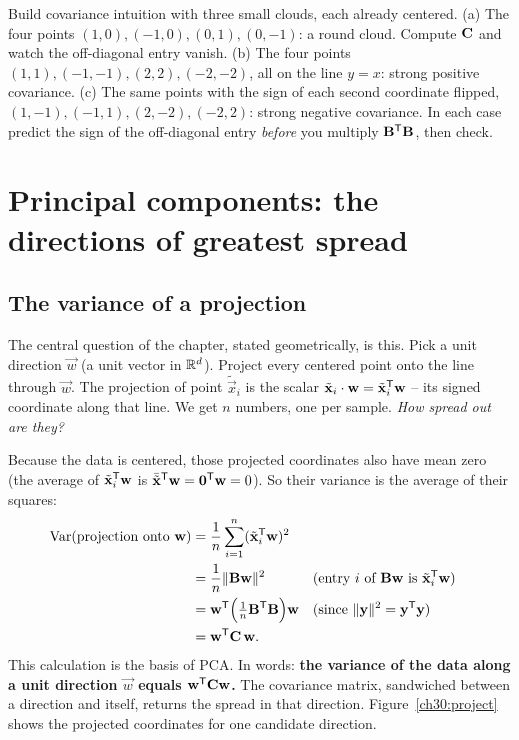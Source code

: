 \begin{labbox}
Build covariance intuition with three small clouds, each already centered.
(a) The four points $(1,0),(-1,0),(0,1),(0,-1)$: a round cloud. Compute $\mathbf{C}$ and
watch the off-diagonal entry vanish. (b) The four points $(1,1),(-1,-1),(2,2),(-2,-2)$,
all on the line $y=x$: strong positive covariance. (c) The same points with the sign
of each second coordinate flipped, $(1,-1),(-1,1),(2,-2),(-2,2)$: strong negative
covariance. In each case predict the sign of the off-diagonal entry \emph{before}
you multiply $\mathbf{B}^{\mathsf{T}}\mathbf{B}$, then check.
\end{labbox}

\section{Principal components: the directions of greatest spread}
\label{ch30:sec-pc}

\subsection{The variance of a projection}

The central question of the chapter, stated geometrically, is this. Pick a
unit direction $\vec w$ (a unit vector in $\mathbb{R}^d$). Project every centered point
onto the line through $\vec w$. The projection of point $\tilde{\vec x}_i$ is the
scalar $\tilde{\mathbf{x}}_i\cdot\mathbf{w} = \tilde{\mathbf{x}}_i^{\mathsf{T}}\mathbf{w}$ -- its signed
coordinate along that line. We get $n$ numbers, one per sample. \emph{How spread
out are they?}

Because the data is centered, those projected coordinates also have mean zero (the
average of $\tilde{\mathbf{x}}_i^{\mathsf{T}}\mathbf{w}$ is $\bar{\tilde{\mathbf{x}}}^{\mathsf{T}}\mathbf{w}=\mathbf{0}^{\mathsf{T}}\mathbf{w}=0$). So their variance is the average of their squares:
\begin{align*}
  \operatorname{Var}(\text{projection onto }\mathbf{w})
  &=\frac1n\sum_{i=1}^n(\tilde{\mathbf{x}}_i^{\mathsf{T}}\mathbf{w})^2\\
  &=\frac1n\lVert\mathbf{B}\mathbf{w}\rVert^2
    &&\text{(entry $i$ of $\mathbf{B}\mathbf{w}$ is $\tilde{\mathbf{x}}_i^{\mathsf{T}}\mathbf{w}$)}\\
  &=\mathbf{w}^{\mathsf{T}}\Big(\tfrac1n\mathbf{B}^{\mathsf{T}}\mathbf{B}\Big)\mathbf{w}
    &&\text{(since $\lVert\mathbf{y}\rVert^2=\mathbf{y}^{\mathsf{T}}\mathbf{y}$)}\\
  &=\mathbf{w}^{\mathsf{T}}\mathbf{C}\,\mathbf{w} .
\end{align*}
This calculation is the basis of PCA. In words: \textbf{the variance of the data along a unit direction $\vec w$ equals
$\mathbf{w}^{\mathsf{T}}\mathbf{C}\mathbf{w}$.} The covariance matrix, sandwiched between a direction and
itself, returns the spread in that direction. Figure~\ref{ch30:project} shows the
projected coordinates for one candidate direction.

